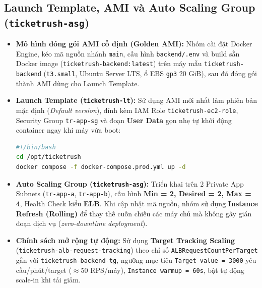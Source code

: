 \subsection{Launch Template, AMI và Auto Scaling Group (\texttt{ticketrush-asg})}
\begin{itemize}[leftmargin=1.5em]
  \item \textbf{Mô hình đóng gói AMI cố định (Golden AMI):} Nhóm cài đặt Docker Engine, kéo mã nguồn nhánh \texttt{main}, cấu hình \texttt{backend/.env} và build sẵn Docker image (\texttt{ticketrush-backend:latest}) trên máy mẫu \texttt{ticketrush-backend} (\texttt{t3.small}, Ubuntu Server LTS, ổ EBS \texttt{gp3} 20 GiB), sau đó đóng gói thành AMI dùng cho Launch Template.
  \item \textbf{Launch Template (\texttt{ticketrush-lt}):} Sử dụng AMI mới nhất làm phiên bản mặc định (\textit{Default version}), đính kèm IAM Role \texttt{ticketrush-ec2-role}, Security Group \texttt{tr-app-sg} và đoạn \textbf{User Data} gọn nhẹ tự khởi động container ngay khi máy vừa boot:
\begin{lstlisting}[language=bash, caption={User Data trong Launch Template \texttt{ticketrush-lt}}]
#!/bin/bash
cd /opt/ticketrush
docker compose -f docker-compose.prod.yml up -d
\end{lstlisting}
  \item \textbf{Auto Scaling Group (\texttt{ticketrush-asg}):} Triển khai trên 2 Private App Subnets (\texttt{tr-app-a}, \texttt{tr-app-b}), cấu hình \textbf{Min = 2, Desired = 2, Max = 4}, Health Check kiểu \textbf{ELB}. Khi cập nhật mã nguồn, nhóm sử dụng \textbf{Instance Refresh (Rolling)} để thay thế cuốn chiếu các máy chủ mà không gây gián đoạn dịch vụ (\textit{zero-downtime deployment}).
  \item \textbf{Chính sách mở rộng tự động:} Sử dụng \textbf{Target Tracking Scaling} (\texttt{ticketrush-alb-request-tracking}) theo chỉ số \texttt{ALBRequestCountPerTarget} gắn với \texttt{ticketrush-backend-tg}, ngưỡng mục tiêu \texttt{Target value = 3000} yêu cầu/phút/target ($\approx 50$ RPS/máy), \texttt{Instance warmup = 60s}, bật tự động scale-in khi tải giảm.
\end{itemize}

